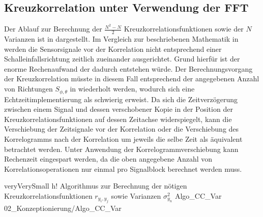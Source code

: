 \subsection{Kreuzkorrelation unter Verwendung der FFT}
\label{subsec:KreuzkorrelationVerwendungFFT}
Der Ablauf zur Berechnung der $\frac{N^2-N}{2}$ Kreuzkorrelationsfunktionen sowie der $N$ Varianzen ist in  dargestellt. Im Vergleich zur beschriebenen Mathematik in  werden die Sensorsignale vor der Korrelation nicht entsprechend einer Schalleinfallsrichtung zeitlich zueinander ausgerichtet. Grund hierfür ist der enorme Rechenaufwand der dadurch entstehen würde. Der Berechnungsvorgang der Kreuzkorrelation müsste in diesem Fall entsprechend der angegebenen Anzahl von Richtungen $S_{\phi,\theta}$ in  wiederholt werden, wodurch sich eine Echtzeitimplementierung als schwierig erweist. Da sich die Zeitverzögerung zwischen einem Signal und dessen verschobener Kopie in der Position der Kreuzkorrelationsfunktionen auf dessen Zeitachse widerspiegelt, kann die Verschiebung der Zeitsignale vor der Korrelation oder die Verschiebung des Korrelogramms nach der Korrelation um jeweils die selbe Zeit als äquivalent betrachtet werden. Unter Anwendung der Korrelogrammverschiebung kann Rechenzeit eingespart werden, da die oben angegebene Anzahl von Korrelationsoperationen nur einmal pro Signalblock berechnet werden muss.

 






         {veryVerySmall}                                                       %
         {h!}                                                  %
         {Algorithmus zur Berechnung der nötigen Kreuzkorrelationsfunktionen $r_{y_i, y_j}$ sowie Varianzen $\sigma^2_{y_n}$}    %
         {Algo_CC_Var}                                               %
         {02_Konzeptionierung/Algo_CC_Var}                           %

